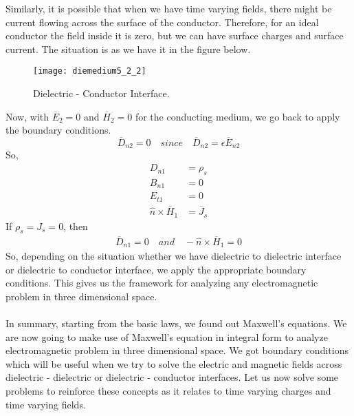   Similarly, it is possible that when we have time varying fields, there might be current flowing across the surface of the conductor. Therefore, for an ideal conductor the field inside it is zero, but we can have surface charges and surface current. The situation is as we have it in the figure below.
	  \begin{figure}[h]
	  	\centering
	  	\texttt{[image: diemedium5\_2\_2]}
	  	\caption{Dielectric - Conductor Interface.}
	  \end{figure}
  Now, with $\overline{E}_2 = 0$ and $\overline{H}_2 = 0$ for the conducting medium, we go back to apply the boundary conditions.
  \begin{equation*}
  \overline{D}_{n2} = 0\quad since\quad \overline{D}_{n2} = \epsilon\overline{E}_{n2}
  \end{equation*}
  So,
  \begin{align*}
  D_{n1} &= \rho_s \\
  B_{n1} &= 0 \\
  E_{t1} &= 0 \\
  \hat{n}\times\overline{H}_1 &= \overline{J}_s
  \end{align*}
  If $\rho_s = J_s = 0$, then
  \begin{align*}
  \overline{D}_{n1} = 0\quad and \quad -\hat{n}\times\overline{H}_{1} = 0
  \end{align*}
  So, depending on the situation whether we have dielectric to dielectric interface or dielectric to conductor interface, we apply the appropriate boundary conditions. This gives us the framework for analyzing any electromagnetic problem in three dimensional space. \\ \\ 
  In summary, starting from the basic laws, we found out Maxwell's equations. We are now going to make use of Maxwell's equation in integral form to analyze electromagnetic problem in three dimensional space. We got boundary conditions which will be useful when we try to solve the electric and magnetic fields across dielectric - dielectric or dielectric - conductor interfaces. Let us now solve some problems to reinforce these concepts as it relates to time varying charges and time varying fields.
